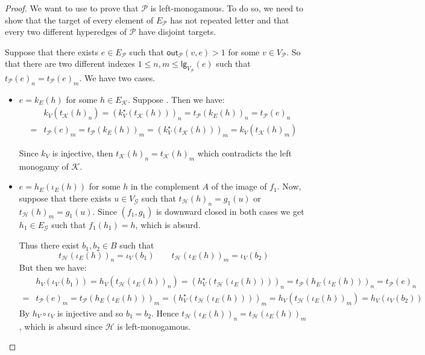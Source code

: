 \documentclass[3p]{elsarticle}
\newcommand{\lgh}{\mathsf{lg}}
\newcommand{\outd}[1]{\mathsf{out}_{\mathcal{#1}}}
\theoremstyle{remark}
\theoremstyle{definition}
\begin{document}
\begin{proof}
We want to use  to prove that $\mathcal{P}$ is left-monogamous. To do so, we need to show that the target of every element of $E_{\mathcal{P}}$ has not repeated letter and that every two different hyperedges of $\mathcal{P}$ have disjoint targets.

Suppose that there exists $e \in E_{\mathcal{P}}$ such that $\outd{P}(v,e) > 1$ for some $v\in V_{\mathcal{P}}$. So that there are two different  indexes $1\leq n, m \leq \lgh_{V_{\mathcal{P}}}(e)$ such that $t_{\mathcal{P}}(e)_n=t_{\mathcal{P}}(e)_m$. We have two cases.
\begin{itemize}
	\item $e= k_E(h)$ for some $h\in E_{\mathcal{K}}$.  Suppose . Then we have:
	\begin{align*}
		&k_V(t_{\mathcal{K}}(h)_n)=(k^\star_V(t_{\mathcal{K}}(h)))_n=t_{\mathcal{P}}(k_E(h))_n=t_{\mathcal{P}}(e)_n \\=& t_{\mathcal{P}}(e)_m = t_{\mathcal{P}}(k_E(h))_m=(k^\star_V(t_{\mathcal{K}}(h)))_m = k_V(t_{\mathcal{K}}(h)_m)	\end{align*}
	
	Since $k_V$ is injective, then $t_{\mathcal{K}}(h)_n=t_{\mathcal{K}}(h)_m$ which contradicts the left monogamy of $\mathcal{K}$.
	
	\item $e=h_E(\iota_E(h))$ for some $h$ in the complement $A$ of the image of $f_1$.  Now, suppose that there exists $u \in V_{\mathcal{G}}$ such that $t_{\mathcal{H}}(h)_n = g_1(u) $ or $t_{\mathcal{H}}(h)_m = g_1(u)$. Since $(f_1, g_1)$ is downward closed in both cases we get $h_1\in E_{\mathcal{G}}$ such that $f_1(h_1)=h$, which is absurd. 
	
	Thus there exist $b_1, b_2\in B$ such that
	\[t_{\mathcal{H}}(\iota_E(h))_n = \iota_V(b_1) \qquad  t_{\mathcal{H}}(\iota_E(h))_m = \iota_V(b_2)\] 
	But then we have:
	\begin{align*}
		&h_V(\iota_V(b_1))=h_V(t_{\mathcal{H}}(\iota_E(h))_n)=(h^\star_V(t_{\mathcal{H}}(\iota_E(h))))_n=t_{\mathcal{P}}(h_E(\iota_E(h)))_n=t_{\mathcal{P}}(e)_n\\=&t_{\mathcal{P}}(e)_m=t_{\mathcal{P}}(h_E(\iota_E(h)))_m=(h^\star_V(t_{\mathcal{H}}(\iota_E(h))))_m=h_V(t_{\mathcal{H}}(\iota_E(h))_m)=	h_V(\iota_V(b_2))
	\end{align*}
	By  $h_V\circ \iota_V$ is injective and so $b_1 = b_2$. Hence $t_{\mathcal{H}}(\iota_E(h))_n =t_{\mathcal{H}}(\iota_E(h))_m $, which is absurd since $\mathcal{H}$ is left-monogamous.
\end{itemize}
 

\end{proof}
\end{document}
